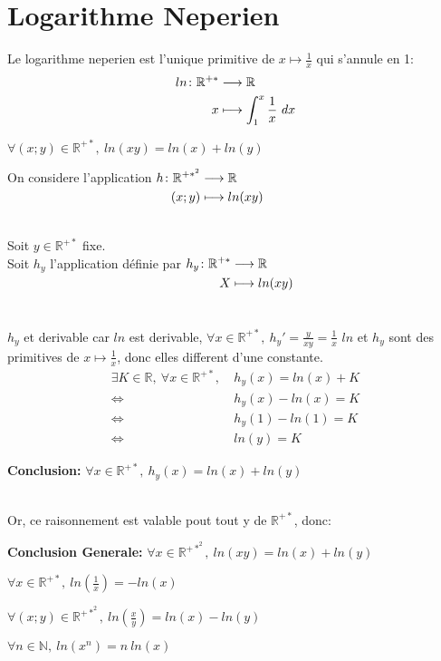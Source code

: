 \documentclass[12pt,twoside,a4paper]{article}
\author{MPSI 2}
\begin{document}
	\maketitle
\section{Logarithme Neperien}
	\begin{defi}
		Le logarithme neperien est l'unique primitive de $x\longmapsto\frac{1}{x}$ qui s'annule en 1:
		$$
			\fonction{ln}{\mathbb{R}^{+*}}{\mathbb{R}}{x}{\int_1^x\frac{1}{x}\ dx}
		$$
	\end{defi}
	\begin{prop}
		$\forall(x;y)\in\mathbb{R}^{+*},\ ln(xy)=ln(x)+ln(y)$
	\end{prop}
	\begin{preuve}
		On considere l'application $\begin{aligned}[t]h\colon\mathbb{R}^{+*^2}&\longrightarrow\mathbb{R} \\(x;y)&\longmapsto ln(xy)\end{aligned}$\\\\
		\begin{tab}
			Soit $y\in\mathbb{R}^{+*}$ fixe. \\
			Soit $h_y$ l'application définie par $\begin{aligned}[t]h_y\colon\mathbb{R}^{+*}&\longrightarrow\mathbb{R} \\X&\longmapsto ln(xy)\end{aligned}$\\\\\\
			$h_y$ et derivable car $ln$ est derivable, $\forall x\in\mathbb{R}^{+*},\ h_y'=\frac{y}{xy}=\frac{1}{x}$
			$ln$ et $h_y$ sont des primitives de $x\longmapsto\frac{1}{x}$, donc elles different d'une constante.
			$$\begin{aligned}
				\exists K\in\mathbb{R},\ \forall x\in\mathbb{R}^{+*},\ &h_y(x)=ln(x)+K\\
				\iff &h_y(x)-ln(x)=K\\
				\iff &h_y(1)-ln(1)=K\\
				\iff &ln(y)=K
			\end{aligned}$$
		\end{tab}
		\textbf{Conclusion:} $\forall x\in\mathbb{R}^{+*},\ h_y(x)=ln(x)+ln(y)$\\
		\\
		\begin{tab}Or, ce raisonnement est valable pout tout y de $\mathbb{R}^{+*}$, donc:\\\end{tab}
		\textbf{Conclusion Generale:} $\forall x\in\mathbb{R}^{+*^2},\ ln(xy)=ln(x)+ln(y)$
	\end{preuve}
	\begin{coro}
		\begin{liste}
			\item $\forall x\in\mathbb{R}^{+*},\ ln\left(\frac{1}{x}\right)=-ln(x)$
			\item $\forall(x;y)\in\mathbb{R}^{+*^2},\ ln\left(\frac{x}{y}\right)=ln(x)-ln(y)$
			\item $\forall n\in\mathbb{N},\ ln\left(x^n\right)=n\ ln(x)$
		\end{liste}
	\end{coro}
\end{document}
